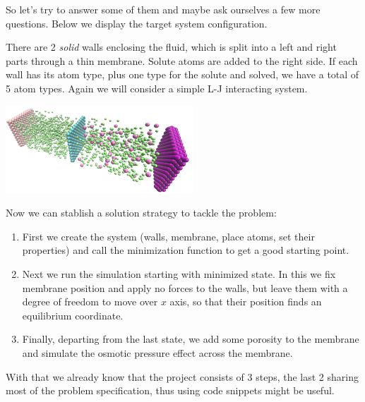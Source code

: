 \begin{frame}[fragile]{\secname}
So let's try to answer some of them and maybe ask ourselves a few more questions. Below we display the target system configuration.

\vspace{0.5cm}

There are 2 \emph{solid} walls enclosing the fluid, which is split into a left and right parts through a thin membrane. Solute atoms are added to the right side. If each wall has its atom type, plus one type for the solute and solved, we have a total of 5 atom types. Again we will consider a simple L-J interacting system.

\vspace{0.5cm}

{%
\hfill
\includegraphics[width=7cm]{media/004-permeable-membrane-minimized.png}
\hfill
}
\end{frame}

\begin{frame}[fragile]{\secname}
Now we can stablish a solution strategy to tackle the problem:

\vspace{0.5cm}

\begin{enumerate}
\item First we create the system (walls, membrane, place atoms, set their properties) and call the minimization function to get a good starting point.

\item Next we run the simulation starting with minimized state. In this we fix membrane position and apply no forces to the walls, but leave them with a degree of freedom to move over $x$ axis, so that their position finds an equilibrium coordinate.

\item Finally, departing from the last state, we add some porosity to the membrane and simulate the osmotic pressure effect across the membrane.
\end{enumerate}

\vspace{0.5cm}

With that we already know that the project consists of 3 steps, the last 2 sharing most of the problem specification, thus using code snippets might be useful.
\end{frame}

